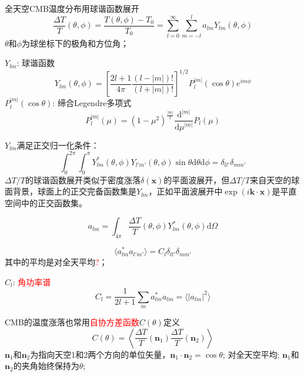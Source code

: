 \documentclass[12pt,a4paper]{article}
\renewcommand{\vec}[1]{\boldsymbol{#1}}
\newcommand{\dif}{\mathrm{d}}
\begin{document}
全天空CMB温度分布用球谐函数展开
\begin{equation}
\frac{\Delta T}{T}(\theta, \phi) = \frac{T(\theta, \phi) -T_0}{T_0} = \sum_{l=0}^{\infty} \sum_{m=-l}^{l} a_{lm} Y_{lm}(\theta, \phi)
\end{equation}
$\theta$和$\phi$为球坐标下的极角和方位角；

$Y_{lm}$: 球谐函数
\begin{equation}
Y_{lm}(\theta, \phi) = \left[ \frac{2l+1}{4\pi} \frac{(l-|m|)!}{(l+|m|)!}  \right]^{1/2} P^{|m|}_l(\cos \theta) e^{im\phi}
\end{equation}
$P^{|m|}_l(\cos \theta)$: 缔合Legendre多项式
\begin{equation}
P^{|m|}_l(\mu) = (1-\mu^2)^{\frac{|m|}{2}} \frac{\dif^{|m|}}{\dif \mu^{|m|}} P_l (\mu)
\end{equation}

$Y_{lm}$满足正交归一化条件：
\begin{equation}
\int_0^{2\pi} \int_0^{\pi} Y^*_{lm}(\theta, \phi) Y_{l'm'}(\theta, \phi) \sin \theta \dif \theta \dif \phi = \delta_{ll'} \delta_{mm'}
\end{equation}
$\Delta T/T$的球谐函数展开类似于密度涨落$\delta (\vec{x})$的平面波展开，但$\Delta T/T$来自天空的球面背景，球面上的正交完备函数集是$Y_{lm}$，正如平面波展开中$\exp(i \vec{k}\cdot \vec{x})$是平直空间中的正交函数集。

\begin{equation}
a_{lm} = \int_{4\pi} \frac{\Delta T}{T}(\theta, \phi) Y^*_{lm}(\theta, \phi) \dif \Omega
\end{equation}

\begin{equation}
\langle a^*_{lm} a_{l'm'} \rangle = C_l \delta_{ll'} \delta_{mm'}
\end{equation}
其中的平均是对全天平均\textcolor{red}{?}；

$C_l$: \textcolor{red}{角功率谱}
\begin{equation}
C_l = \frac{1}{2l +1} \sum_m a^*_{lm} a_{lm} = \langle |a_{lm}|^2 \rangle
\end{equation}

CMB的温度涨落也常用\textcolor{red}{自协方差函数}$C(\theta)$定义
\begin{equation}
C(\theta) = \left \langle \frac{\Delta T}{T}(\vec{n}_1) \frac{\Delta T}{T}(\vec{n}_2) \right \rangle
\end{equation}
$\vec{n}_1$和$\vec{n}_2$为指向天空1和2两个方向的单位矢量，$\vec{n}_1 \cdot \vec{n}_2 = \cos \theta$; 对全天空平均; $\vec{n}_1$和$\vec{n}_2$的夹角始终保持为$\theta$;
\end{document}
